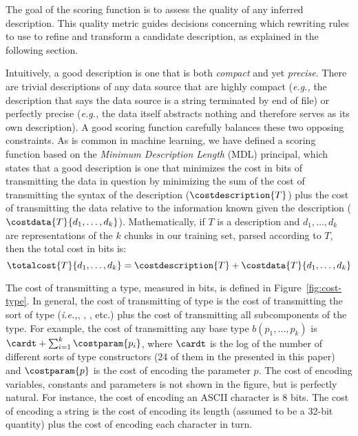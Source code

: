 The goal of the scoring function is to assess the quality of any
inferred description.  This quality metric guides decisions concerning
which rewriting rules to use to refine and transform a candidate
description, as explained in the following section.

Intuitively, a good description is one that is both {\em compact} and
yet {\em precise}.  There are trivial descriptions of any data source
that are highly compact ({\em e.g.,} the description that says
the data source is a string terminated by end of file) or
perfectly precise ({\em e.g.,} the data itself abstracts nothing and
therefore serves as its own description).  A good scoring function
carefully balances these two opposing constraints.  As is common
in machine learning, we have defined a scoring function based on the
{\em Minimum Description Length} (MDL) principal, which states that
a good description is one that minimizes the cost in bits of transmitting
the data in question by minimizing the sum of the cost of transmitting
the syntax of the description ($\costdescription{T}$)
plus the cost of transmitting the data 
relative to the information known given the description
($\costdata{T}{d_1,\ldots,d_k}$).  Mathematically,
if $T$ is a description and $d_1,\ldots,d_k$ are representations of
the $k$ chunks in our training set, parsed according to $T$, then the 
total cost in bits is:
\[
\totalcost{T}{d_1,\ldots,d_k} = \costdescription{T} + \costdata{T}{d_1,\ldots,d_k}
\]

The cost of transmitting a type, measured in bits, is defined in 
Figure~\ref{fig:cost-type}.  In general, the cost of transmitting
of type is the cost of transmitting the sort of type ({\em i.e.,},
, , etc.) plus the cost of transmitting all subcomponents
of the type.  For example, the cost of transmitting any base type
$b(p_1,\ldots,p_k)$ is $ \cardt + \sum_{i=1}^{k} \costparam{p_i}$,
where $\cardt$ is the log of the number of different sorts of type 
constructors (24 of them in the \ir{} presented in this paper)
and $\costparam{p}$ is the cost of encoding the parameter $p$.
The cost of encoding variables, constants and parameters is not
shown in the figure, but is perfectly natural.  For instance, the cost of
encoding an ASCII character is 8 bits.  The cost of encoding a string
is the cost of encoding its length (assumed to be a 32-bit quantity)
plus the cost of encoding each character in turn.


